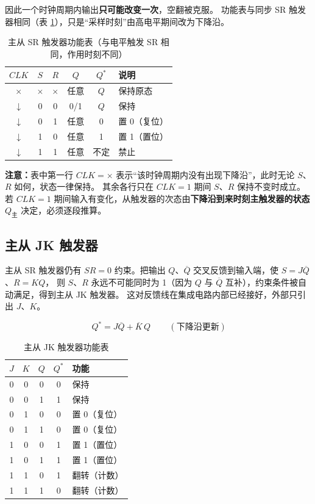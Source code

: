 \noindent 因此一个时钟周期内输出\textbf{只可能改变一次}，空翻被克服。
功能表与同步 SR 触发器相同（表 \ref{tab:sync_sr_like}），只是“采样时刻”由高电平期间改为下降沿。

\begin{table}[!htbp]
\centering
\caption{主从 SR 触发器功能表（与电平触发 SR 相同，作用时刻不同）}
\label{tab:sync_sr_like}
\begin{tabular}{cc|cc|cl}
\toprule
$CLK$ & $S$ & $R$ & $Q$ & $Q^*$ & 说明 \\
\midrule
$\times$ & $\times$ & $\times$ & 任意 & $Q$ & 保持原态 \\
$\downarrow$ & 0 & 0 & 0/1 & $Q$ & 保持 \\
$\downarrow$ & 0 & 1 & 任意 & 0 & 置 0（复位） \\
$\downarrow$ & 1 & 0 & 任意 & 1 & 置 1（置位） \\
$\downarrow$ & 1 & 1 & 任意 & 不定 & 禁止 \\
\bottomrule
\end{tabular}
\end{table}

\noindent\textbf{注意：}表中第一行 $CLK=\times$ 表示“该时钟周期内没有出现下降沿”，此时无论 $S$、$R$ 如何，状态一律保持。
其余各行只在 $CLK=1$ 期间 $S$、$R$ 保持不变时成立。若 $CLK=1$ 期间输入有变化，从触发器的次态由\textbf{下降沿到来时刻主触发器的状态} $Q_{\text{主}}$ 决定，必须逐段推算。

\subsection{主从 JK 触发器}
主从 SR 触发器仍有 $SR=0$ 约束。把输出 $Q$、$\overline{Q}$ 交叉反馈到输入端，使 $S=J\overline{Q}$、$R=KQ$，
则 $S$、$R$ 永远不可能同时为 1（因为 $Q$ 与 $\overline{Q}$ 互补），约束条件被自动满足，得到主从 JK 触发器。
这对反馈线在集成电路内部已经接好，外部只引出 $J$、$K$。

\begin{equation}
\boxed{\,Q^* = J\overline{Q} + \overline{K}\,Q\,} \qquad (\text{下降沿更新})
\label{eq:jk}
\end{equation}

\begin{table}[!htbp]
\centering
\caption{主从 JK 触发器功能表}
\begin{tabular}{cc|cc|l}
\toprule
$J$ & $K$ & $Q$ & $Q^*$ & 功能 \\
\midrule
0 & 0 & 0 & 0 & 保持 \\
0 & 0 & 1 & 1 & 保持 \\
0 & 1 & 0 & 0 & 置 0（复位） \\
0 & 1 & 1 & 0 & 置 0（复位） \\
1 & 0 & 0 & 1 & 置 1（置位） \\
1 & 0 & 1 & 1 & 置 1（置位） \\
1 & 1 & 0 & 1 & 翻转（计数） \\
1 & 1 & 1 & 0 & 翻转（计数） \\
\bottomrule
\end{tabular}
\end{table}

